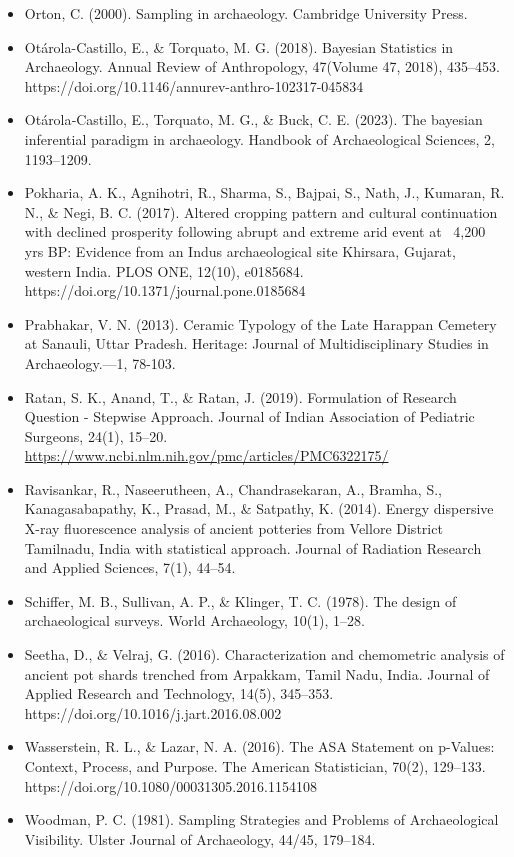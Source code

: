 \documentclass{article}
\begin{document}
\begin{itemize}
    \item Orton, C. (2000). Sampling in archaeology. Cambridge University Press.
    \item Otárola-Castillo, E., \& Torquato, M. G. (2018). Bayesian Statistics in Archaeology. Annual Review of Anthropology, 47(Volume 47, 2018), 435–453. https://doi.org/10.1146/annurev-anthro-102317-045834
    \item Otárola‐Castillo, E., Torquato, M. G., \& Buck, C. E. (2023). The bayesian inferential paradigm in archaeology. Handbook of Archaeological Sciences, 2, 1193–1209.
    \item Pokharia, A. K., Agnihotri, R., Sharma, S., Bajpai, S., Nath, J., Kumaran, R. N., \& Negi, B. C. (2017). Altered cropping pattern and cultural continuation with declined prosperity following abrupt and extreme arid event at ~4,200 yrs BP: Evidence from an Indus archaeological site Khirsara, Gujarat, western India. PLOS ONE, 12(10), e0185684. 
    https://doi.org/10.1371/journal.pone.0185684
    \item Prabhakar, V. N. (2013). Ceramic Typology of the Late Harappan Cemetery at Sanauli, Uttar Pradesh. Heritage: Journal of Multidisciplinary Studies in Archaeology.—1, 78-103.
    \item Ratan, S. K., Anand, T., \& Ratan, J. (2019). Formulation of Research Question - Stepwise Approach. Journal of Indian Association of Pediatric Surgeons, 24(1), 15–20. \\
    \href{https://www.ncbi.nlm.nih.gov/pmc/articles/PMC6322175/}{https://www.ncbi.nlm.nih.gov/pmc/articles/PMC6322175/}
    \item Ravisankar, R., Naseerutheen, A., Chandrasekaran, A., Bramha, S., Kanagasabapathy, K., Prasad, M., \& Satpathy, K. (2014). Energy dispersive X-ray fluorescence analysis of ancient potteries from Vellore District Tamilnadu, India with statistical approach. Journal of Radiation Research and Applied Sciences, 7(1), 44–54.
    \item Schiffer, M. B., Sullivan, A. P., \& Klinger, T. C. (1978). The design of archaeological surveys. World Archaeology, 10(1), 1–28.
    \item Seetha, D., \& Velraj, G. (2016). Characterization and chemometric analysis of ancient pot shards trenched from Arpakkam, Tamil Nadu, India. Journal of Applied Research and Technology, 14(5), 345–353. \\
    https://doi.org/10.1016/j.jart.2016.08.002
    \item Wasserstein, R. L., \& Lazar, N. A. (2016). The ASA Statement on p-Values: Context, Process, and Purpose. The American Statistician, 70(2), 129–133. \\
    https://doi.org/10.1080/00031305.2016.1154108
    \item Woodman, P. C. (1981). Sampling Strategies and Problems of Archaeological Visibility. Ulster Journal of Archaeology, 44/45, 179–184.
\end{itemize}
\end{document}
